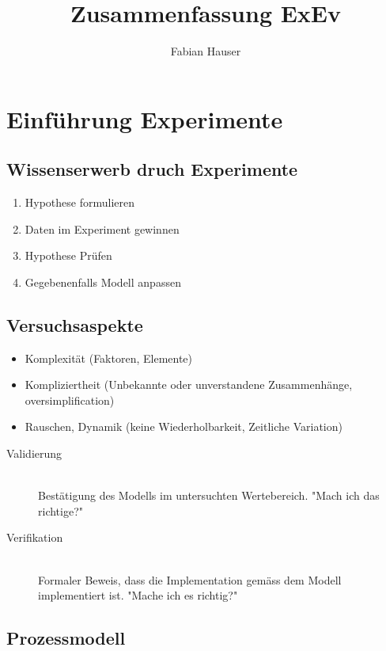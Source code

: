 

\title{Zusammenfassung ExEv}
\author{Fabian Hauser}
 

\maketitle

\section{Einführung Experimente}

\subsection{Wissenserwerb druch Experimente}
\begin{enumerate}
	\item	Hypothese formulieren
	\item	Daten im Experiment gewinnen
	\item	Hypothese Prüfen
	\item	Gegebenenfalls Modell anpassen
\end{enumerate}

\subsection{Versuchsaspekte}
\begin{itemize}
	\item	Komplexität			(Faktoren, Elemente)
	\item	Kompliziertheit		(Unbekannte oder unverstandene Zusammenhänge, oversimplification)
	\item	Rauschen, Dynamik	(keine Wiederholbarkeit, Zeitliche Variation)
\end{itemize}

\begin{description}
	\item[Validierung] \hfill \\
		Bestätigung des Modells im untersuchten Wertebereich. "Mach ich das richtige?"
	\item[Verifikation] \hfill \\
		Formaler Beweis, dass die Implementation gemäss dem Modell implementiert ist. "Mache ich es richtig?"
\end{description}

\subsection{Prozessmodell}

